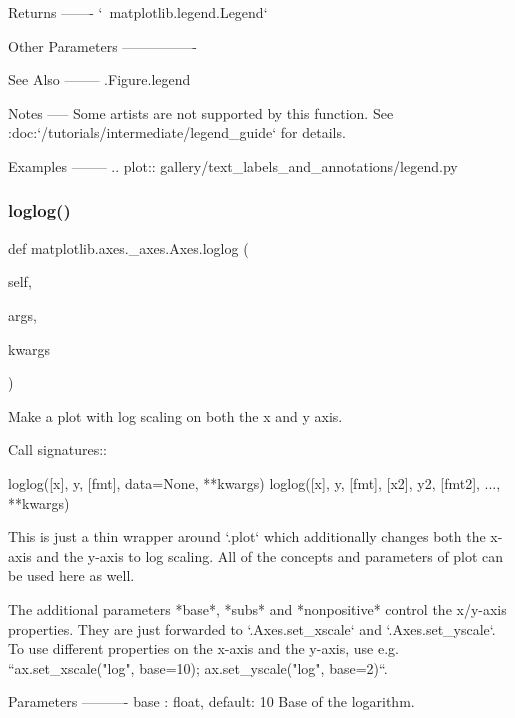 \begin{DoxyVerb}
\begin{DoxyVerb}
Returns
-------
`~matplotlib.legend.Legend`

Other Parameters
----------------

See Also
--------
.Figure.legend

Notes
-----
Some artists are not supported by this function.  See
:doc:`/tutorials/intermediate/legend_guide` for details.

Examples
--------
.. plot:: gallery/text_labels_and_annotations/legend.py
\end{DoxyVerb}
 \mbox{\label{classmatplotlib_1_1axes_1_1__axes_1_1Axes_a18fa810319e66528b71d165da51cc453}} 
\subsubsection{\texorpdfstring{loglog()}{loglog()}}
{\footnotesize\ttfamily def matplotlib.\+axes.\+\_\+axes.\+Axes.\+loglog (\begin{DoxyParamCaption}\item[{}]{self,  }\item[{}]{args,  }\item[{}]{kwargs }\end{DoxyParamCaption})}

\begin{DoxyVerb}Make a plot with log scaling on both the x and y axis.

Call signatures::

    loglog([x], y, [fmt], data=None, **kwargs)
    loglog([x], y, [fmt], [x2], y2, [fmt2], ..., **kwargs)

This is just a thin wrapper around `.plot` which additionally changes
both the x-axis and the y-axis to log scaling. All of the concepts and
parameters of plot can be used here as well.

The additional parameters *base*, *subs* and *nonpositive* control the
x/y-axis properties. They are just forwarded to `.Axes.set_xscale` and
`.Axes.set_yscale`. To use different properties on the x-axis and the
y-axis, use e.g.
``ax.set_xscale("log", base=10); ax.set_yscale("log", base=2)``.

Parameters
----------
base : float, default: 10
    Base of the logarithm.


\end{DoxyVerb}
\end{DoxyVerb}
